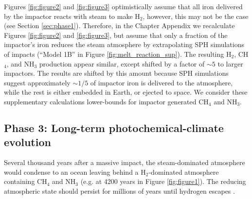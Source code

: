 Figures \ref{fig:figure2} and \ref{fig:figure3} optimistically assume that all iron delivered by the impactor reacts with steam to make H$_2$, however, this may not be the case (see Section \ref{sec:phase1}). Therefore, in the Chapter Appendix we recalculate Figures \ref{fig:figure2} and \ref{fig:figure3}, but assume that only a fraction of the impactor's iron reduces the steam atmosphere by extrapolating SPH simulations of impacts (``Model 1B'' in Figure \ref{fig:melt_reaction_sup}). The resulting H$_2$, CH$_4$, and NH$_3$ production appear similar, except shifted by a factor of $\sim 5$ to larger impactors. The results are shifted by this amount because SPH simulations suggest approximately $\sim 1/5$ of impactor iron is delivered to the atmosphere, while the rest is either embedded in Earth, or ejected to space. We consider these supplementary calculations lower-bounds for impactor generated CH$_4$ and NH$_3$.

\subsection{Phase 3: Long-term photochemical-climate evolution} \label{sec:phase3}

Several thousand years after a massive impact, the steam-dominated atmosphere would condense to an ocean leaving behind a H$_2$-dominated atmosphere containing CH$_4$ and NH$_3$ (e.g. at 4200 years in Figure \ref{fig:figure1}). The reducing atmospheric state should persist for millions of years until hydrogen escapes \citep{Zahnle_2020}.

